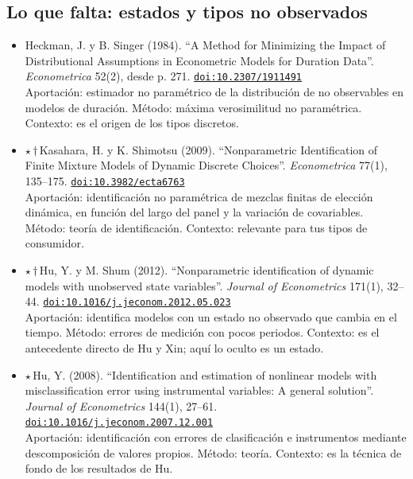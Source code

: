 \documentclass[11pt]{article}
\begin{document}
\subsection*{Lo que falta: estados y tipos no observados}
\begin{itemize}
\item Heckman, J. y B. Singer (1984). ``A Method for Minimizing the Impact of Distributional Assumptions in Econometric Models for Duration Data''. \textit{Econometrica} 52(2), desde p. 271. \href{https://doi.org/10.2307/1911491}{\texttt{doi:10.2307/1911491}}\\
Aportación: estimador no paramétrico de la distribución de no observables en modelos de duración. Método: máxima verosimilitud no paramétrica. Contexto: es el origen de los tipos discretos.
\item $\star$\,$\dagger$\,Kasahara, H. y K. Shimotsu (2009). ``Nonparametric Identification of Finite Mixture Models of Dynamic Discrete Choices''. \textit{Econometrica} 77(1), 135--175. \href{https://doi.org/10.3982/ecta6763}{\texttt{doi:10.3982/ecta6763}}\\
Aportación: identificación no paramétrica de mezclas finitas de elección dinámica, en función del largo del panel y la variación de covariables. Método: teoría de identificación. Contexto: relevante para tus tipos de consumidor.
\item $\star$\,$\dagger$\,Hu, Y. y M. Shum (2012). ``Nonparametric identification of dynamic models with unobserved state variables''. \textit{Journal of Econometrics} 171(1), 32--44. \href{https://doi.org/10.1016/j.jeconom.2012.05.023}{\texttt{doi:10.1016/j.jeconom.2012.05.023}}\\
Aportación: identifica modelos con un estado no observado que cambia en el tiempo. Método: errores de medición con pocos periodos. Contexto: es el antecedente directo de Hu y Xin; aquí lo oculto es un estado.
\item $\star$\,Hu, Y. (2008). ``Identification and estimation of nonlinear models with misclassification error using instrumental variables: A general solution''. \textit{Journal of Econometrics} 144(1), 27--61. \href{https://doi.org/10.1016/j.jeconom.2007.12.001}{\texttt{doi:10.1016/j.jeconom.2007.12.001}}\\
Aportación: identificación con errores de clasificación e instrumentos mediante descomposición de valores propios. Método: teoría. Contexto: es la técnica de fondo de los resultados de Hu.

\end{itemize}
\end{document}
